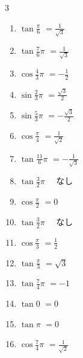 \begin{multicols}{3}
\begin{enumerate}
  \item $\displaystyle \tan{\frac{\pi}{6}}$
        $\displaystyle =\frac{1}{\sqrt{3}}$

  \item $\displaystyle \tan{\frac{7}{6}\pi}$
        $\displaystyle =\frac{1}{\sqrt{3}}$

  \item $\displaystyle \cos{\frac{4}{3}\pi}$
        $\displaystyle =-\frac{1}{2}$

  \item $\displaystyle \sin{\frac{2}{3}\pi}$
        $\displaystyle =\frac{\sqrt{3}}{2}$

  \item $\displaystyle \sin{\frac{5}{3}\pi}$
        $\displaystyle =-\frac{\sqrt{3}}{2}$

  \item $\displaystyle \cos{\frac{\pi}{4}}$
        $\displaystyle =\frac{1}{\sqrt{2}}$

  \item $\displaystyle \tan{\frac{11}{6}\pi}$
        $\displaystyle =-\frac{1}{\sqrt{3}}$

  \item $\displaystyle \tan{\frac{3}{2}\pi}$
        $\displaystyle \quad なし$

  \item $\displaystyle \cos{\frac{\pi}{2}}$
        $\displaystyle =0$

  \item $\displaystyle \tan{\frac{3}{2}\pi}$
        $\displaystyle \quad なし$

  \item $\displaystyle \cos{\frac{\pi}{3}}$
        $\displaystyle =\frac{1}{2}$

\columnbreak %

  \item $\displaystyle \tan{\frac{\pi}{3}}$
        $\displaystyle =\sqrt{3}$

  \item $\displaystyle \tan{\frac{7}{4}\pi}$
        $\displaystyle =-1$

  \item $\displaystyle \tan{0}$
        $\displaystyle =0$

  \item $\displaystyle \tan{\pi}$
        $\displaystyle =0$

  \item $\displaystyle \cos{\frac{7}{4}\pi}$
        $\displaystyle =\frac{1}{\sqrt{2}}$


\end{enumerate}
\end{multicols}
